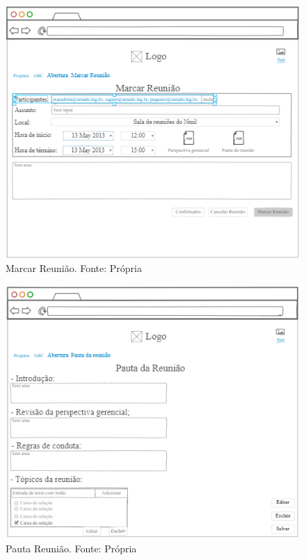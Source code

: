 \begin{figure}[H]
    \centering
    \includegraphics[width=1.0\textwidth]{figuras/marcar_reunicao.png}
    \caption{Marcar Reunião. Fonte: Própria}
    \label{img:prototipo_marcar_reuniao}
\end{figure}

\begin{figure}[H]
    \centering
    \includegraphics[width=1.0\textwidth]{figuras/pauta_reuniao.png}
    \caption{Pauta Reunião. Fonte: Própria}
    \label{img:prototipo_pauta_reuniao}
\end{figure}

